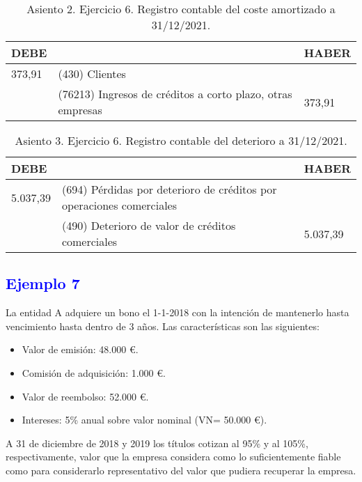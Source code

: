 \begin{table}[H]
    \centering
    \begin{tabular}{|p{3cm}|p{6cm}|p{3cm}|}
    \hline
    \rowcolor{blue!30}
    \textbf{DEBE} & \textbf{} & \textbf{HABER} \\
    \hline
    373,91 & (430) Clientes &  \\
    \hline
     & (76213) Ingresos de créditos a corto plazo, otras empresas & 373,91 \\
    \hline
    \end{tabular}
    \caption{Asiento 2. Ejercicio 6. Registro contable del coste amortizado a 31/12/2021.}
    \label{tabla:asiento2ej6}
\end{table}

\begin{table}[H]
    \centering
    \begin{tabular}{|p{3cm}|p{6cm}|p{3cm}|}
    \hline
    \rowcolor{blue!30}
    \textbf{DEBE} & \textbf{} & \textbf{HABER} \\
    \hline
    5.037,39 & (694) Pérdidas por deterioro de créditos por operaciones comerciales &  \\
    \hline
     & (490) Deterioro de valor de créditos comerciales & 5.037,39 \\
    \hline
    \end{tabular}
    \caption{Asiento 3. Ejercicio 6. Registro contable del deterioro a 31/12/2021.}
    \label{tabla:asiento3ej6}
\end{table}

\subsection*{\textcolor{blue}{Ejemplo 7}}

La entidad A adquiere un bono el 1-1-2018 con la intención de mantenerlo hasta vencimiento hasta dentro de 3 años. Las características son las siguientes:
\begin{itemize}
    \item Valor de emisión: 48.000 €.
    \item Comisión de adquisición: 1.000 €.
    \item Valor de reembolso: 52.000 €.
    \item Intereses: 5\% anual sobre valor nominal (VN= 50.000 €).
\end{itemize}

A 31 de diciembre de 2018 y 2019 los títulos cotizan al 95\% y al 105\%, respectivamente, valor que la empresa considera como lo suficientemente fiable como para considerarlo representativo del valor que pudiera recuperar la empresa.

